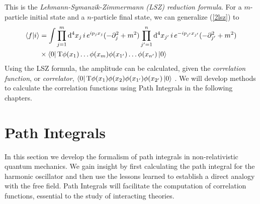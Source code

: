 \vspace{0.1cm}This is the \textit{Lehmann-Symanzik-Zimmermann (LSZ) reduction formula}. For a $m$-particle initial state and a $n$-particle final state, we can generalize (\ref{2lsz}) to
\begin{equation}\begin{aligned}
    \braket{f}{i}&=\int\prod_{j=1}^m \dd^4x_j\, i\,e^{ip_jx_j}(-\partial_j^2+m^2)\prod_{j^\prime=1}^n \dd^4x_{j^\prime}\,i\, e^{-ip_{j^\prime}x_{j^\prime}}(-\partial_{j^\prime}^2+m^2)\\
    &\times\bra{0}\text{T}\phi(x_1)\dots\phi(x_m)\phi(x_{1^\prime})\dots\phi(x_{n^\prime})\ket{0}
\end{aligned}
\end{equation}
\vspace{0.1cm}Using the LSZ formula, the amplitude can be calculated, given the \textit{correlation function}, or \textit{correlator}, $\bra{0}\text{T}\phi(x_1)\phi(x_2)\phi(x_{1^\prime})\phi(x_{2^\prime})\ket{0}$ . We will develop methods to calculate the correlation functions using Path Integrals in the following chapters.\\


\section{Path Integrals}
In this section we develop the formalism of path integrals in non-relativistic quantum mechanics. We gain insight by first calculating the path integral for the harmonic oscillator and then use the lessons learned to establish a direct analogy with the free field. Path Integrals will facilitate the computation of correlation functions, essential to the study of interacting theories.


